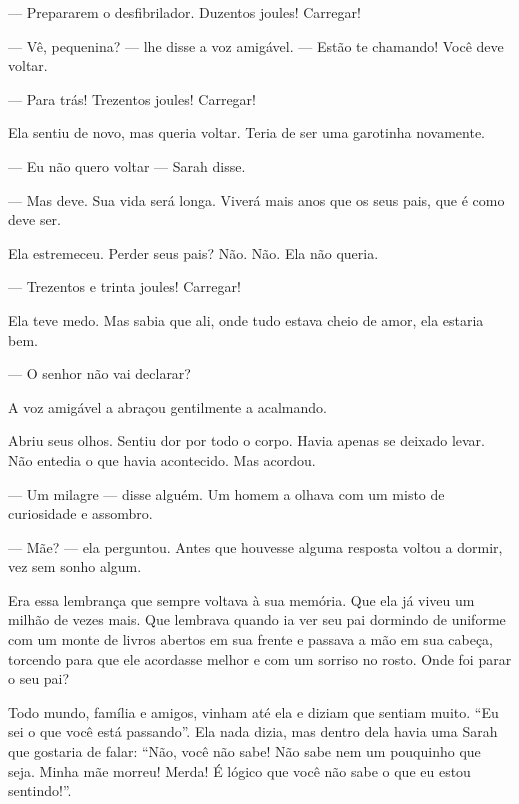 --- Prepararem o desfibrilador. Duzentos joules! Carregar!


--- Vê, pequenina? --- lhe disse a voz amigável. --- Estão te chamando! Você deve voltar.

--- Para trás! Trezentos joules! Carregar!

Ela sentiu de novo, mas  queria voltar. Teria de ser uma garotinha novamente.

--- Eu não quero voltar --- Sarah disse.

--- Mas deve. Sua vida será longa. Viverá mais anos que os seus pais, que é como deve ser.

Ela estremeceu. Perder seus pais? Não. Não. Ela não queria.

--- Trezentos e trinta joules! Carregar!

Ela teve medo. Mas sabia que ali, onde tudo estava cheio de amor, ela estaria bem.

--- O senhor não vai declarar?

A voz amigável a abraçou gentilmente a acalmando.


Abriu seus olhos. Sentiu dor por todo o corpo. Havia apenas se deixado levar. Não entedia o que havia acontecido. Mas acordou.

--- Um milagre --- disse alguém. Um homem a olhava com um misto de curiosidade e assombro.

--- Mãe? --- ela perguntou. Antes que houvesse alguma resposta\mudanca{,} voltou a dormir,  vez sem sonho algum.

Era essa lembrança que sempre voltava à sua memória. Que ela já viveu um milhão de vezes mais. Que  lembrava quando ia ver seu pai dormindo de uniforme com um monte de livros abertos em sua frente e passava a mão em sua cabeça, torcendo para que ele acordasse melhor e com um sorriso no rosto. Onde foi parar o seu pai?

Todo mundo, família e amigos, vinham até ela e diziam que sentiam muito. ``Eu sei o que você está passando''. Ela nada dizia, mas dentro dela havia uma Sarah que gostaria de falar: ``Não, você não sabe! Não sabe nem um pouquinho que seja. Minha mãe morreu! Merda! É lógico que você não sabe o que eu estou sentindo!''.


